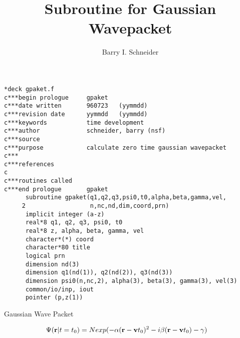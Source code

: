 \documentclass{article}
\title{Subroutine for Gaussian Wavepacket}
\author{Barry I. Schneider}
\date{}
\begin{document}
 \maketitle
\begin{verbatim}
*deck gpaket.f
c***begin prologue     gpaket
c***date written       960723   (yymmdd)
c***revision date      yymmdd   (yymmdd)
c***keywords           time development
c***author             schneider, barry (nsf)
c***source             
c***purpose            calculate zero time gaussian wavepacket 
c***                   
c***references         
c
c***routines called    
c***end prologue       gpaket
      subroutine gpaket(q1,q2,q3,psi0,t0,alpha,beta,gamma,vel,
     2                  n,nc,nd,dim,coord,prn)
      implicit integer (a-z)
      real*8 q1, q2, q3, psi0, t0
      real*8 z, alpha, beta, gamma, vel
      character*(*) coord
      character*80 title
      logical prn
      dimension nd(3)
      dimension q1(nd(1)), q2(nd(2)), q3(nd(3))
      dimension psi0(n,nc,2), alpha(3), beta(3), gamma(3), vel(3)
      common/io/inp, iout
      pointer (p,z(1))
\end{verbatim}
 \center Gaussian Wave Packet
 \par
\begin{eqnarray}
 & \Psi({\bf r}|t=t_0) = N exp( -\alpha ( {\bf r} - {\bf v} t_0 )^2
                                -i \beta ( {\bf r} - {\bf v}t_0 ) - \gamma )
 \end{eqnarray}
\end{document}
